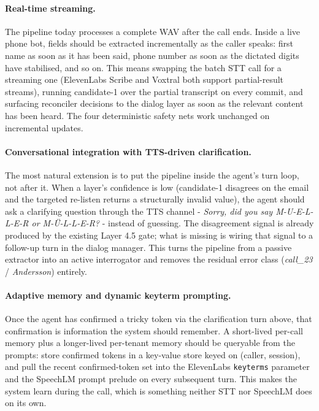 \documentclass[11pt,a4paper]{article}
\begin{document}
\paragraph{Real-time streaming.}
The pipeline today processes a complete WAV after the call ends.
Inside a live phone bot, fields should be extracted incrementally as
the caller speaks: first name as soon as it has been said, phone
number as soon as the dictated digits have stabilised, and so on.
This means swapping the batch STT call for a streaming one
(ElevenLabs Scribe and Voxtral both support partial-result streams),
running candidate-1 over the partial transcript on every commit,
and surfacing reconciler decisions to the dialog layer as soon as
the relevant content has been heard. The four deterministic safety
nets work unchanged on incremental updates.

\paragraph{Conversational integration with TTS-driven clarification.}
The most natural extension is to put the pipeline inside the
agent's turn loop, not after it. When a layer's confidence is low
(candidate-1 disagrees on the email and the targeted re-listen
returns a structurally invalid value), the agent should ask a
clarifying question through the TTS channel - \textit{Sorry, did
you say M-U-E-L-L-E-R or M-\"U-L-L-E-R?} - instead of guessing.
The disagreement signal is already produced by the existing
Layer 4.5 gate; what is missing is wiring that signal to a
follow-up turn in the dialog manager. This turns the pipeline from
a passive extractor into an active interrogator and removes the
residual error class (\textit{call\_23} / \textit{Andersson})
entirely.

\paragraph{Adaptive memory and dynamic keyterm prompting.}
Once the agent has confirmed a tricky token via the clarification
turn above, that confirmation is information the system should
remember. A short-lived per-call memory plus a longer-lived
per-tenant memory should be queryable from the prompts: store
confirmed tokens in a key-value store keyed on (caller, session),
and pull the recent confirmed-token set into the ElevenLabs
\verb|keyterms| parameter and the SpeechLM prompt prelude on every
subsequent turn. This makes the system learn during the call,
which is something neither STT nor SpeechLM does on its own.
\end{document}
